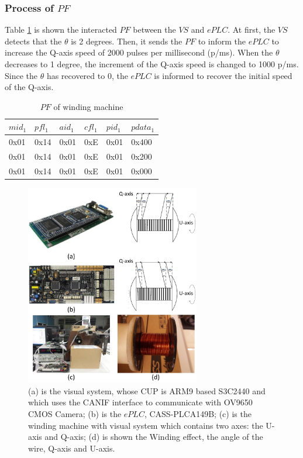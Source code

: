 \documentclass[journal,UTF8]{IEEEtran}
\begin{document}
\subsubsection{Process of $PF$}
Table \ref{table:PFofWinding} is shown the interacted $PF$ between the $VS$ and $ePLC$. At first, the $VS$ detects that the $\theta$ is 2 degrees. Then, it sends the $PF$ to inform the $ePLC$ to increase the Q-axis speed of 2000 pulses per millisecond (p/ms). When the $\theta$ decreases to 1 degree, the increment of the Q-axis speed is changed to 1000 p/ms. Since the $\theta$ has recovered to 0, the $ePLC$ is informed to recover the initial speed of the Q-axis.  
\begin{table}
	\scriptsize \caption{$PF$ of winding machine}
	\label{table:PFofWinding}
	\begin{center}
		\renewcommand{\arraystretch}{1.4}
		\setlength\tabcolsep{3pt}
		\begin{tabular}{|p{1.2cm}|p{1.2cm}|p{1.2cm}|p{1.2cm}|p{1.2cm}|p{1cm}|}
			\hline
			$mid_1$  & $pfl_1$ &$aid_1$ & $cfl_1$  & $pid_1$  &$pdata_1$   \\
			\hline
			0x01    & 0x14  &0x01  &0xE     &0x01   &0x400   \\
			\hline
			0x01    & 0x14  &0x01  &0xE     &0x01   &0x200   \\
			\hline
			0x01    & 0x14  &0x01  &0xE     &0x01   &0x000   \\
			\hline
		\end{tabular}
	\end{center}
\end{table}
\begin{figure}
	\centering
	\includegraphics[width=3in]{fig/Winding.pdf}
	\caption{ (a) is the visual system, whose CUP is ARM9 based S3C2440 and which uses the CANIF interface to communicate with OV9650 CMOS Camera; (b) is the $ePLC$, CASS-PLCA149B; (c) is the winding machine with visual system which contains two axes: the U-axis and Q-axis; (d) is shown the Winding effect, the angle of the wire, Q-axis and U-axis.}
	\label{fig:Winding}
\end{figure}
\end{document}
